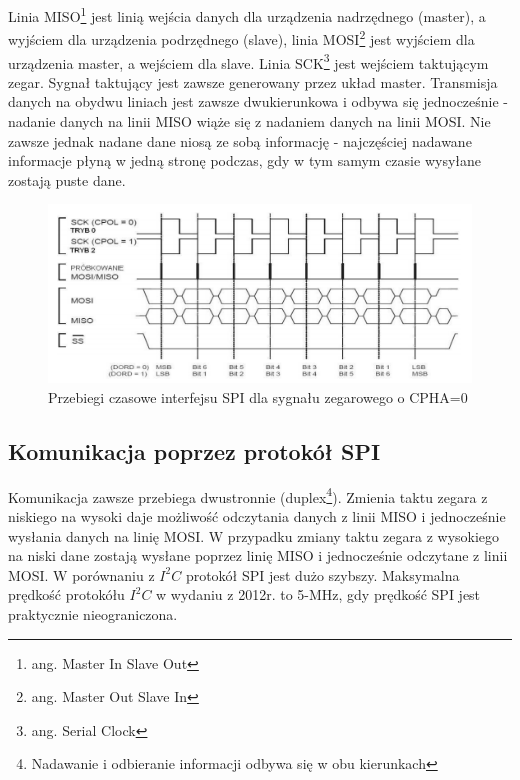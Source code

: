 \documentclass{xmgr}
\begin{document}
Linia MISO\footnote{ang. Master In Slave Out} jest linią wejścia danych dla urządzenia nadrzędnego (master), a wyjściem dla urządzenia podrzędnego (slave), linia MOSI\footnote{ang. Master Out Slave In} jest wyjściem dla urządzenia master, a wejściem dla slave. Linia SCK\footnote{ang. Serial Clock} jest wejściem taktującym zegar. Sygnał taktujący jest zawsze generowany przez układ master. Transmisja danych na obydwu liniach jest zawsze dwukierunkowa i odbywa się jednocześnie - nadanie danych na linii MISO wiąże się z nadaniem danych na linii MOSI. Nie zawsze jednak nadane dane niosą ze sobą informację - najczęściej nadawane informacje płyną w jedną stronę podczas, gdy w tym samym czasie wysyłane zostają puste dane.\cite{dorra}

\begin{figure}[!h]
    \centering
    \includegraphics[height=0.25\textheight]{images/spi.png}
    \caption{Przebiegi czasowe interfejsu SPI dla sygnału zegarowego o CPHA=0}
\end{figure}

\subsection{Komunikacja poprzez protokół SPI}
Komunikacja zawsze przebiega dwustronnie (duplex\footnote{Nadawanie i odbieranie informacji odbywa się w obu kierunkach}). Zmienia taktu zegara z niskiego na wysoki daje możliwość odczytania danych z linii MISO i jednocześnie wysłania danych na linię MOSI. W przypadku zmiany taktu zegara z wysokiego na niski dane zostają wysłane poprzez linię MISO i jednocześnie odczytane z linii MOSI. W porównaniu z $I^2C$ protokół SPI jest dużo szybszy. Maksymalna prędkość protokółu $I^2C$ w wydaniu z 2012r. to 5-MHz, gdy prędkość SPI jest praktycznie nieograniczona.
\end{document}

